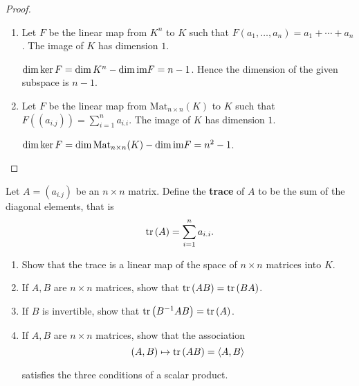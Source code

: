 \begin{proof}
    \begin{enumerate}[label={(\alph*)}]
        \item Let $F$ be the linear map from $K^{n}$ to $K$ such that $F(a_{1}, \ldots, a_{n}) = a_{1} + \cdots + a_{n}$. The image of $K$ has dimension $1$.

              $\dim\ker F = \dim K^{n} - \dim\text{im} F = n - 1$. Hence the dimension of the given subspace is $n - 1$.
        \item Let $F$ be the linear map from $\text{Mat}_{n\times n}(K)$ to $K$ such that $F((a_{i.j})) = \sum^{n}_{i=1}a_{i.i}$. The image of $K$ has dimension $1$.

              $\dim\ker F = \dim\text{Mat}_{n\times n}(K) - \dim\text{im} F = n^{2} - 1$.
    \end{enumerate}
\end{proof}

\begin{exercise}
    Let $A = {(a_{i.j})}$ be an $n\times n$ matrix. Define the \textbf{trace} of $A$ to be the sum of the diagonal elements, that is
    \[
        \text{tr}\left({A}\right) = \sum^{n}_{i=1}a_{i.i}.
    \]

    \begin{enumerate}[label={(\alph*)}]
        \item Show that the trace is a linear map of the space of $n\times n$ matrices into $K$.
        \item If $A, B$ are $n\times n$ matrices, show that $\text{tr}\left({AB}\right) = \text{tr}\left({BA}\right)$.
        \item If $B$ is invertible, show that $\text{tr}\left({B^{-1}AB}\right) = \text{tr}\left({A}\right)$.
        \item If $A, B$ are $n\times n$ matrices, show that the association
              \[
                  (A, B) \mapsto \text{tr}\left({AB}\right) = \left\langle{A, B}\right\rangle
              \]

              satisfies the three conditions of a scalar product.
    \end{enumerate}
\end{exercise}

